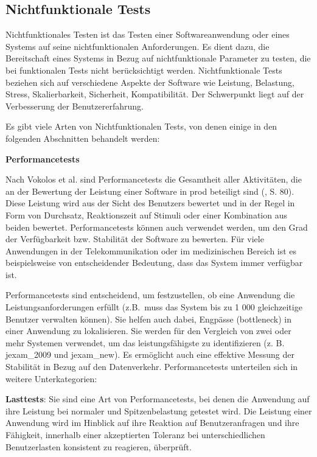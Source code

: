 \subsection{Nichtfunktionale Tests}

Nichtfunktionales Testen ist das Testen einer Softwareanwendung oder
eines Systems auf seine nichtfunktionalen Anforderungen. Es dient dazu,
die Bereitschaft eines Systems in Bezug auf nichtfunktionale Parameter zu
testen, die bei funktionalen Tests nicht berücksichtigt werden.
Nichtfunktionale Tests beziehen sich auf verschiedene Aspekte der Software
wie Leistung, Belastung, Stress, Skalierbarkeit, Sicherheit, Kompatibilität.
Der Schwerpunkt liegt auf der Verbesserung der Benutzererfahrung.


Es gibt viele Arten von Nichtfunktionalen Tests, von denen einige in den
folgenden Abschnitten behandelt werden:

\textbf{Performancetests}

Nach Vokolos et al. sind Performancetests die Gesamtheit aller Aktivitäten,
die an der Bewertung der Leistung einer Software in \gls{prod}
beteiligt sind (\cite{vokolos1998performance}, S. 80).
Diese Leistung wird aus der Sicht des Benutzers bewertet und in der
Regel in Form von Durchsatz, Reaktionszeit auf Stimuli oder einer
Kombination aus beiden bewertet. Performancetests können auch verwendet
werden, um den Grad der Verfügbarkeit bzw. Stabilität der Software zu
bewerten. Für viele Anwendungen in der Telekommunikation oder im
medizinischen Bereich ist es beispielsweise von entscheidender Bedeutung,
dass das System immer verfügbar ist.


Performancetests sind entscheidend, um festzustellen, ob eine Anwendung die
Leistungsanforderungen erfüllt (z.B.\ muss das System bis zu 1 000
gleichzeitige Benutzer verwalten können). Sie helfen auch dabei, Engpässe
(\gls{bottleneck}) in einer Anwendung zu lokalisieren. Sie werden
für den Vergleich von zwei oder mehr Systemen verwendet, um das
leistungsfähigste zu identifizieren (z. B. \gls{jexam_2009}  und \gls{jexam_new}).
Es ermöglicht auch eine effektive Messung der Stabilität in Bezug auf den
Datenverkehr. Performancetests unterteilen sich in weitere Unterkategorien:


\textbf{Lasttests}: Sie sind eine Art von Performancetests,
bei denen die Anwendung auf ihre Leistung bei normaler und Spitzenbelastung
getestet wird. Die Leistung einer Anwendung wird im Hinblick auf ihre Reaktion
auf Benutzeranfragen und ihre Fähigkeit, innerhalb einer akzeptierten Toleranz
bei unterschiedlichen Benutzerlasten konsistent zu reagieren, überprüft.


